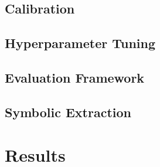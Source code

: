 \documentclass[12pt,a4paper,oneside]{article}
\begin{document}
\subsection{Calibration}\label{subsec:calibration}



\subsection{Hyperparameter Tuning}\label{subsec:tuning}



\subsection{Evaluation Framework}\label{subsec:evaluation}



\subsection{Symbolic Extraction}\label{subsec:symbolic}



\newpage
\section{Results}\label{sec:results}
\end{document}
